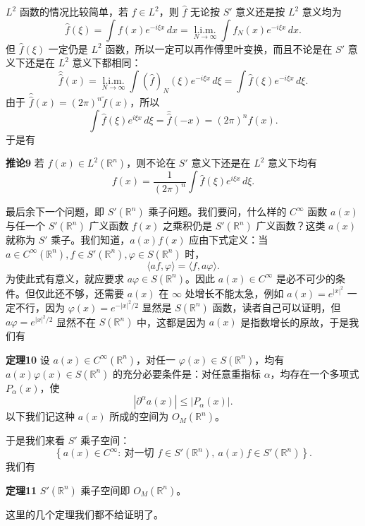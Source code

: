 $L^2$ 函数的情况比较简单，若 $f\in L^2$，则 $\widehat f$ 无论按 $S'$ 意义还是按 $L^2$ 意义均为
\[
 \widehat f(\xi)=\int f(x)e^{-i\xi x}\,dx
 =\operatorname*{l.i.m.}_{N\to\infty}\int f_N(x)e^{-i\xi x}\,dx.
\]
但 $\widehat f(\xi)$ 一定仍是 $L^2$ 函数，所以一定可以再作傅里叶变换，而且不论是在 $S'$ 意义下还是在 $L^2$ 意义下都相同：
\[
 \widehat{\widehat f}(x)
 =\operatorname*{l.i.m.}_{N\to\infty}\int (\widehat f)_N(\xi)e^{-i\xi x}\,d\xi
 =\int\widehat f(\xi)e^{-i\xi x}\,d\xi.
\]
由于 $\widehat{\widehat f}(x)=(2\pi)^n\widetilde f(x)$，所以
\[
 \int\widehat f(\xi)e^{i\xi x}\,d\xi
 =\widehat{\widehat f}(-x)=(2\pi)^nf(x).
\]
于是有

\noindent\textbf{推论9}\quad
若 $f(x)\in L^2(\mathbb R^n)$，则不论在 $S'$ 意义下还是在 $L^2$ 意义下均有
\[
 f(x)=\frac1{(2\pi)^n}\int\widehat f(\xi)e^{i\xi x}\,d\xi.
\]

最后余下一个问题，即 $S'(\mathbb R^n)$ 乘子问题。我们要问，什么样的 $C^\infty$ 函数 $a(x)$ 与任一个 $S'(\mathbb R^n)$ 广义函数 $f(x)$ 之乘积仍是 $S'(\mathbb R^n)$ 广义函数？这类 $a(x)$ 就称为 $S'$ 乘子。我们知道，$a(x)f(x)$ 应由下式定义：当 $a\in C^\infty(\mathbb R^n),f\in S'(\mathbb R^n),\varphi\in S(\mathbb R^n)$ 时，
\begin{equation}
 \langle af,\varphi\rangle=\langle f,a\varphi\rangle.
 \tag{30}
\end{equation}
为使此式有意义，就应要求 $a\varphi\in S(\mathbb R^n)$。因此 $a(x)\in C^\infty$ 是必不可少的条件。但仅此还不够，还需要 $a(x)$ 在 $\infty$ 处增长不能太急，例如 $a(x)=e^{|x|^2}$ 一定不行，因为 $\varphi(x)=e^{-|x|^2/2}$ 显然是 $S(\mathbb R^n)$ 函数，读者自己可以证明，但 $a\varphi=e^{|x|^2/2}$ 显然不在 $S(\mathbb R^n)$ 中，这都是因为 $a(x)$ 是指数增长的原故，于是我们有

\noindent\textbf{定理10}\quad
设 $a(x)\in C^\infty(\mathbb R^n)$，对任一 $\varphi(x)\in S(\mathbb R^n)$，均有 $a(x)\varphi(x)\in S(\mathbb R^n)$ 的充分必要条件是：对任意重指标 $\alpha$，均存在一个多项式 $P_\alpha(x)$，使
\begin{equation}
 |\partial^\alpha a(x)|\le|P_\alpha(x)|.
 \tag{31}
\end{equation}
以下我们记这种 $a(x)$ 所成的空间为 $O_M(\mathbb R^n)$。

于是我们来看 $S'$ 乘子空间：
\[
 \left\{a(x)\in C^\infty:\ \text{对一切 }f\in S'(\mathbb R^n),\ a(x)f\in S'(\mathbb R^n)\right\}.
\]
我们有

\noindent\textbf{定理11}\quad
$S'(\mathbb R^n)$ 乘子空间即 $O_M(\mathbb R^n)$。

这里的几个定理我们都不给证明了。
